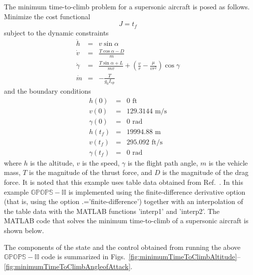 \documentclass[10pt]{article}
\newenvironment{shadedframe}{%
  \def\FrameCommand{\fcolorbox{black}{shadecolor}}%
  \MakeFramed {\FrameRestore}}
{\endMakeFramed}
\newcommand{\bfblue}[1]{\textrm{{\color{blue}{\bf #1}}}}
\newcommand{\slred}[1]{\textrm{\color{red}{\sl #1}}}
\begin{document}
The minimum time-to-climb problem for a supersonic aircraft is posed
as follows.  Minimize the cost functional
\begin{equation}
  J = t_f
\end{equation}
subject to the dynamic constraints
\begin{eqnarray}
  \dot{h} & = & v\sin\alpha \\
  \dot{v} & = & \frac{T\cos\alpha-D}{m} \\
 \dot{\gamma} & = & \frac{T\sin\alpha+L}{mv}+\left(\frac{v}{r}-\frac{\mu}{vr^2}\right)\cos\gamma\\
 \dot{m} & =&  -\frac{T}{g_0 I_{sp}} 
\end{eqnarray}
and the boundary conditions
\begin{eqnarray}
  h(0) & = & 0 \textrm{ ft} \\
  v(0) & = & 129.3144 \textrm{ m/s} \\
  \gamma(0) & = & 0 \textrm{ rad} \\
  h(t_f) & = & 19994.88 \textrm{ m} \\
  v(t_f) & = & 295.092 \textrm{ ft/s} \\
  \gamma(t_f) & = & 0 \textrm{ rad}
\end{eqnarray}
where $h$ is the altitude, $v$ is the speed, $\gamma$ is the
flight path angle, $m$ is the vehicle mass, $T$ is the magnitude of
the thrust force, and $D$ is the magnitude of the drag force.  It is
noted that this example uses table data obtained from
Ref.~.  In this example $\mathbb{GPOPS-II}$ is implemented using the
finite-difference derivative option (that is, using the option
\slred{setup}.\bfblue{derivatives}='finite-difference') together with an interpolation of the
table data with the MATLAB functions 'interp1' and 'interp2'.   The
MATLAB code that solves the minimum time-to-climb of a supersonic 
aircraft is shown below.
\begin{shadedframe}




\end{shadedframe} 
The components of the state and the control obtained from running the
above $\mathbb{GPOPS-II}$ code is summarized in Figs.~\ref{fig:minimumTimeToClimbAltitude}--\ref{fig:minimumTimeToClimbAngleofAttack}.
\end{document}
